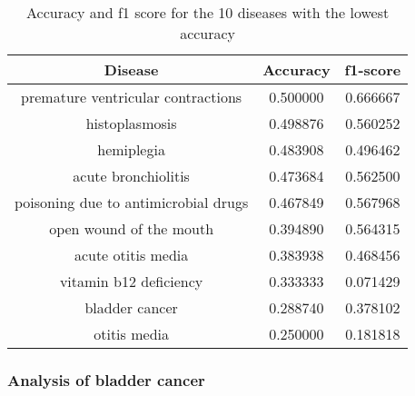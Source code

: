 \begin{table}[H]
	\centering
	\small
	\begin{tabular}{|c|c|c|}
		\hline
		\textbf{Disease}                     & \textbf{Accuracy} & \textbf{f1-score} \\
		\hline
		premature ventricular contractions   & 0.500000          & 0.666667          \\
		histoplasmosis                       & 0.498876          & 0.560252          \\
		hemiplegia                           & 0.483908          & 0.496462          \\
		acute bronchiolitis                  & 0.473684          & 0.562500          \\
		poisoning due to antimicrobial drugs & 0.467849          & 0.567968          \\
		open wound of the mouth              & 0.394890          & 0.564315          \\
		acute otitis media                   & 0.383938          & 0.468456          \\
		vitamin b12 deficiency               & 0.333333          & 0.071429          \\
		bladder cancer                       & 0.288740          & 0.378102          \\
		otitis media                         & 0.250000          & 0.181818          \\
		\hline
	\end{tabular}
	\caption{Accuracy and f1 score for the 10 diseases with the lowest accuracy}
	\label{worst}
\end{table}

\subsubsection*{Analysis of bladder cancer}

